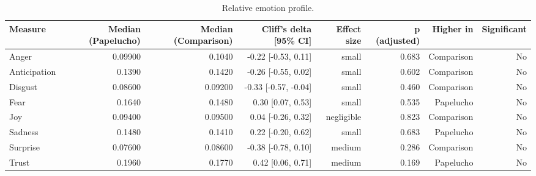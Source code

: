 \begin{table}[htbp]
\centering
\small
\caption{Relative emotion profile.}
\label{tab:emotions-relative}
\begin{tabular}{lrrrrrrr}
\toprule
\textbf{Measure} & \textbf{Median (Papelucho)} & \textbf{Median (Comparison)} & \textbf{Cliff's delta [95\% CI]} & \textbf{Effect size} & \textbf{p (adjusted)} & \textbf{Higher in} & \textbf{Significant} \\
\midrule
Anger & 0.09900 & 0.1040 & -0.22 [-0.53, 0.11] & small & 0.683 & Comparison & No \\
Anticipation & 0.1390 & 0.1420 & -0.26 [-0.55, 0.02] & small & 0.602 & Comparison & No \\
Disgust & 0.08600 & 0.09200 & -0.33 [-0.57, -0.04] & small & 0.460 & Comparison & No \\
Fear & 0.1640 & 0.1480 & 0.30 [0.07, 0.53] & small & 0.535 & Papelucho & No \\
Joy & 0.09400 & 0.09500 & 0.04 [-0.26, 0.32] & negligible & 0.823 & Comparison & No \\
Sadness & 0.1480 & 0.1410 & 0.22 [-0.20, 0.62] & small & 0.683 & Papelucho & No \\
Surprise & 0.07600 & 0.08600 & -0.38 [-0.78, 0.10] & medium & 0.286 & Comparison & No \\
Trust & 0.1960 & 0.1770 & 0.42 [0.06, 0.71] & medium & 0.169 & Papelucho & No \\
\bottomrule
\end{tabular}
\end{table}

